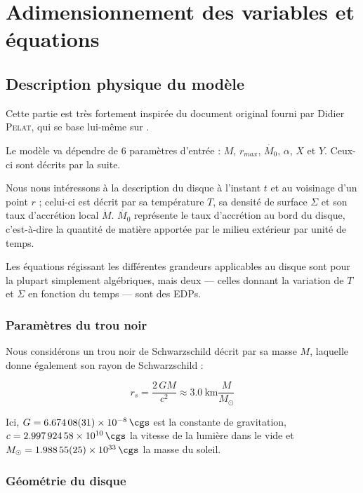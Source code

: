 \section{Adimensionnement des variables et équations}

\subsection{Description physique du modèle}

Cette partie est très fortement inspirée du document original fourni par Didier
\textsc{Pelat}, qui se base lui-même sur \citet{1984}.

Le modèle va dépendre de 6 paramètres d’entrée : $M$, $r_{max}$, $\dot{M_0}$,
$\alpha$, $X$ et $Y$. Ceux-ci sont décrits par la suite.

Nous nous intéressons à la description du disque à l’instant $t$ et au
voisinage d’un point $r$ ; celui-ci est décrit par sa température $T$, sa
densité de surface $\Sigma$ et son taux d’accrétion local $\dot{M}$.
$\dot{M_0}$ représente le taux d’accrétion au bord du disque, c’est-à-dire la
quantité de matière apportée par le milieu extérieur par unité de temps.

Les équations régissant les différentes grandeurs applicables au disque sont
pour la plupart simplement algébriques, mais deux — celles donnant la variation
de $T$ et $\Sigma$ en fonction du temps — sont des EDPs.

\subsubsection{Paramètres du trou noir}

Nous considérons un trou noir de Schwarzschild décrit par sa masse $M$,
laquelle donne également son rayon de Schwarzschild :

\begin{equation}
    \label{eq:rayon_schwarzschild}
    r_s = \frac{\num{2}\, G M}{c^2} \approx \SI{3.0}{\kilo\meter} \frac{M}{M_{\odot}}
\end{equation}

Ici, $G = \SI{6.67408(31)d-8}{\cgs}$ est la
constante de gravitation, $c = \SI{2.99792458e10}{\cgs}$ la
vitesse de la lumière dans le vide et $M_{\odot} = \SI{1.98855(25)d33}{\cgs}$
la masse du soleil.

\subsubsection{Géométrie du disque}

